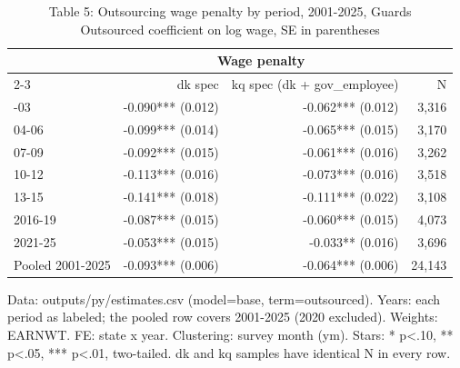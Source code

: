 \begin{table}[!t]
\caption*{
{\large Table 5: Outsourcing wage penalty by period, 2001-2025, Guards} \\
{\small Outsourced coefficient on log wage, SE in parentheses}
} 

\fontsize{10.0pt}{12.0pt}\selectfont

\begin{tabular*}{\linewidth}{@{\extracolsep{\fill}}l|rrr}
\toprule
  & \multicolumn{2}{c}{Wage penalty} &  \\ 
\cmidrule(lr){2-3}
  & dk spec & kq spec (dk + gov\_employee) & N \\ 
\midrule\addlinespace[2.5pt]
2001-03 & -0.090*** (0.012) & -0.062*** (0.012) & 3,316 \\
04-06 & -0.099*** (0.014) & -0.065*** (0.015) & 3,170 \\
07-09 & -0.092*** (0.015) & -0.061*** (0.016) & 3,262 \\
10-12 & -0.113*** (0.016) & -0.073*** (0.016) & 3,518 \\
13-15 & -0.141*** (0.018) & -0.111*** (0.022) & 3,108 \\
2016-19 & -0.087*** (0.015) & -0.060*** (0.015) & 4,073 \\
2021-25 & -0.053*** (0.015) & -0.033** (0.016) & 3,696 \\
Pooled 2001-2025 & -0.093*** (0.006) & -0.064*** (0.006) & 24,143 \\
\bottomrule
\end{tabular*}
\begin{minipage}{\linewidth}
Data: outputs/py/estimates.csv (model=base, term=outsourced). Years: each period as labeled; the pooled row covers 2001-2025 (2020 excluded). Weights: EARNWT. FE: state x year. Clustering: survey month (ym). Stars: * p<.10, ** p<.05, *** p<.01, two-tailed. dk and kq samples have identical N in every row.\\
\end{minipage}
\end{table}

